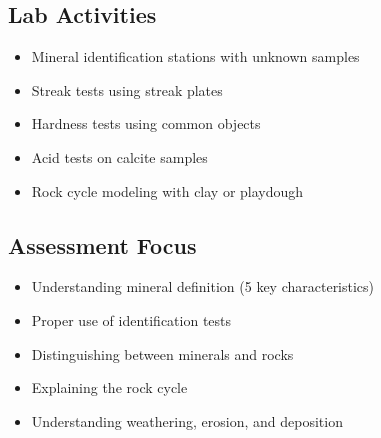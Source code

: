 \documentclass{article}
\begin{document}
\subsection{Lab Activities}
\begin{itemize}
    \item Mineral identification stations with unknown samples
    \item Streak tests using streak plates
    \item Hardness tests using common objects
    \item Acid tests on calcite samples
    \item Rock cycle modeling with clay or playdough
\end{itemize}

\subsection{Assessment Focus}
\begin{itemize}
    \item Understanding mineral definition (5 key characteristics)
    \item Proper use of identification tests
    \item Distinguishing between minerals and rocks
    \item Explaining the rock cycle
    \item Understanding weathering, erosion, and deposition
\end{itemize}
\end{document}
